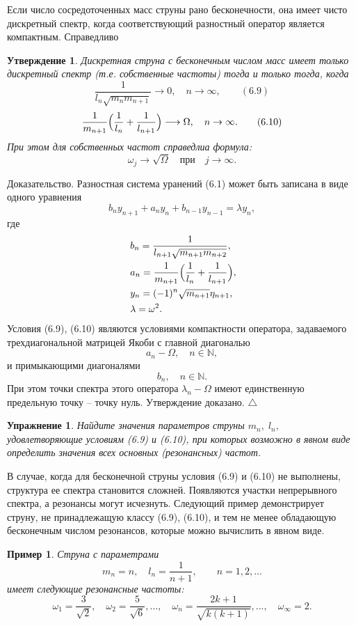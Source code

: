\documentclass[12pt,a4paper]{article}
\theoremstyle{plain}   \newtheorem{Pro}{Задача}
\newtheorem{Sta}{Утверждение}
\newtheorem{Exe}{Упражнение}
\newtheorem{Exa}{Пример}
\begin{document}
Если число сосредоточенных масс струны рано бесконечности,
она имеет чисто дискретный спектр, когда соответствующий
разностный оператор является компактным. Справедливо
\begin{Sta}
Дискретная струна с бесконечным числом масс имеет только дискретный
спектр (т.е. собственные частоты) тогда и только тогда, когда
$$
  \frac{1}{l_n \sqrt{m_n m_{n+1}}}
    \longrightarrow 0 , \quad n \rightarrow \infty ,
	  \qquad (6.9)
$$
$$
  \frac{1}{m_{n+1}} \Bigl (
    \frac{1}{l_n}+\frac{1}{l_{n+1}} \Bigr )
	  \longrightarrow \Omega ,
	    \quad n \rightarrow \infty . \qquad (6.10)
$$
При этом для собственных частот справедлиа формула:
$$
  \omega _j \longrightarrow \sqrt{\Omega}
    \quad \mathrm{при} \quad j \rightarrow \infty .
$$
\end{Sta}
{\Large Доказательство.}
Разностная система уранений (6.1) может быть записана
в виде одного уравнения
$$
  b_n y_{n+1}+a_n y_n +b_{n-1}y_{n-1}=\lambda y_n ,
$$
где
\begin{align*}
  \; & b_n =\frac{1}
    {l_{n+1}\sqrt{m_{n+1}m_{n+2}}}, \\
  \; & a_n =\frac{1}{m_{n+1}} \Bigl (
    \frac{1}{l_n}+\frac{1}{l_{n+1}} \Bigr ) , \\
  \; & y_n =(-1)^n \sqrt{m_{n+1}}\eta _{n+1} , \\
  \; & \lambda =\omega ^2 .
\end{align*}
Условия (6.9), (6.10) являются условиями компактности оператора,
задаваемого трехдиагональной матрицей Якоби с главной диагональю
$$
  a_n -\Omega , \quad n \in \mathbb{N} ,
$$
и примыкающими диагоналями
$$
  b_n , \quad n \in \mathbb{N}.
$$
При этом точки спектра этого оператора
$ \lambda _n -\Omega $
имеют единственную предельную точку --
точку нуль.
Утверждение доказано.
$ \triangle $
\begin{Exe}
Найдите значения параметров струны
$ m_n , \; l_n , $
удовлетворяющие условиям (6.9) и (6.10), при которых
возможно в явном виде определить значения всех
основных (резонансных) частот.
\end{Exe}
В случае, когда для бесконечной струны условия (6.9)
и (6.10) не выполнены, структура ее спектра становится
сложней. Появляются участки непрерывного спектра,
а резонансы могут исчезнуть. Следующий пример демонстрирует струну,
не принадлежащую классу (6.9), (6.10), и тем не менее обладающую
бесконечным числом резонансов, которые можно вычислить в
явном виде.
\begin{Exa}
Струна с параметрами
$$
  m_n =n , \quad l_n =\frac{1}{n+1} ,
    \quad \quad n=1,2,...
$$
имеет следующие резонансные частоты:
$$
  \omega _1 =\frac{3}{\sqrt{2}}, \quad
  \omega _2 =\frac{5}{\sqrt{6}},...,\quad
  \omega _n =\frac{2k+1}{\sqrt{k(k+1)}}, ..., \quad
  \omega _{\infty}=2.
$$
\end{Exa}
\newpage
\end{document}
